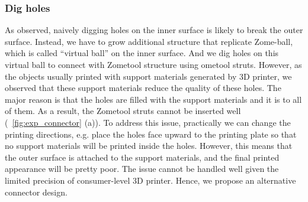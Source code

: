 \subsubsection{Dig holes}
As observed, naively digging holes on the inner surface is likely to break the outer surface.
Instead, we have to grow additional structure that replicate Zome-ball, which is called ``virtual ball'' on the inner surface.
And we dig holes on this virtual ball to connect with  Zometool structure using ometool struts.
However, as the objects usually printed with support materials generated by 3D printer, we observed that these support materials  reduce the quality of these holes.
The major reason is that the holes are filled with the support materials and it is  to  all of them.
As a result, the Zometool struts cannot be inserted well (\figname~\ref{fig:exp_connector} (a)).
To address this issue, practically we can change the printing directions, e.g.\chinky{,} place the holes face upward to the printing plate so that no support materials will be printed inside the holes.
However, this means that the outer surface is attached to the support materials, and the final printed appearance will be pretty poor.
The issue cannot be handled well given the limited precision of consumer-level 3D printer.
Hence, we propose an alternative connector design.
    

